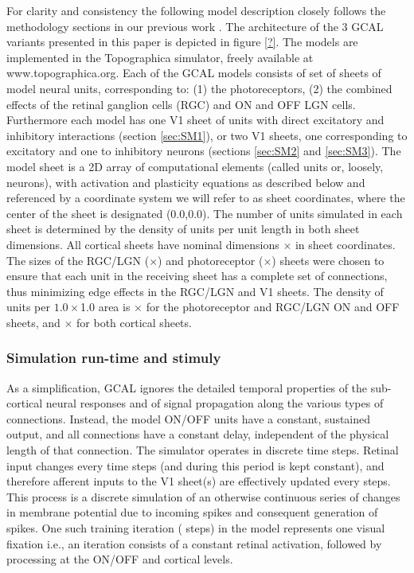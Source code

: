 \documentclass[a4paper,10pt]{article}
\begin{document}
For clarity and consistency the following model description closely follows the methodology sections in our 
previous work \cite{Stevens2013,Antolik2011}. The architecture of the 3 GCAL variants presented in this 
paper is depicted in figure \ref{?}. The models are implemented in the Topographica simulator, freely available at www.topographica.org. 
Each of the GCAL models consists of set of sheets of model neural units,
corresponding to: (1) the photoreceptors, (2) the combined effects of the retinal ganglion cells (RGC) and ON and OFF LGN cells.
Furthermore each model has one V1 sheet of units with direct excitatory and inhibitory interactions (section \ref{sec:SM1}), or two 
V1 sheets, one corresponding to excitatory and one to inhibitory neurons (sections \ref{sec:SM2} and \ref{sec:SM3}).
The model sheet is a 2D array of computational elements (called units or, loosely, neurons), with activation and plasticity equations as 
described below and referenced by a coordinate system we will refer to as sheet coordinates, where the center of the sheet is designated (0.0,0.0).  
The number of units simulated in each sheet is determined by the density of units per unit length in both sheet dimensions. 
All cortical sheets have nominal dimensions $\times$ in sheet coordinates. The sizes of the
RGC/LGN ($\times$) and photoreceptor ($\times$) sheets
were chosen to ensure that each unit in the receiving sheet has a complete set of connections, thus minimizing edge effects in the
RGC/LGN and V1 sheets. The density of units per $1.0\times$1.0 area is $\times$ 
for the photoreceptor and RGC/LGN ON and OFF sheets, and $\times$ for both cortical sheets.

\subsubsection{Simulation run-time and stimuly}

As a simplification, GCAL ignores the detailed temporal properties of the sub-cortical neural responses and of signal propagation along the various types of connections. Instead, the model ON/OFF units have a constant, sustained output, and all connections have a constant delay, independent of the physical length of that connection. The simulator operates in discrete time steps. Retinal input changes every  time steps (and during this period is kept constant), and therefore afferent inputs to the V1 sheet(s) are effectively updated every  steps. This process is a discrete simulation of an otherwise continuous series of changes in membrane potential due to incoming spikes and consequent generation of spikes. One such training iteration ( steps) in the model represents one visual fixation i.e., an iteration consists of a constant retinal activation, followed by processing at the ON/OFF and cortical levels.
\end{document}
